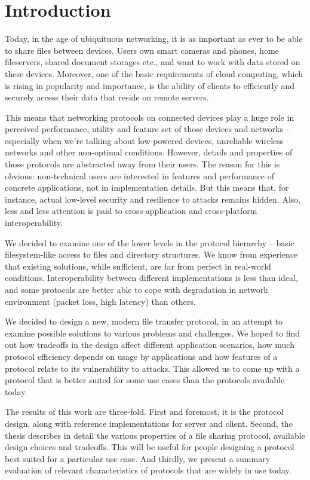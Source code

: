 \chapter*{Introduction}

Today, in the age of ubiquituous networking, it is as important as ever to be able to share files between
devices. Users own smart cameras and phones, home fileservers, shared document storages etc., and want to
work with data stored on these devices. Moreover, one of the basic requirements of cloud computing, which is
rising in popularity and importance, is the ability of clients to efficiently and securely access their data
that reside on remote servers.

This means that networking protocols on connected devices play a huge role in perceived performance, utility
and feature set of those devices and networks -- especially when we're talking about low-powered devices,
unreliable wireless networks and other non-optimal conditions. However, details and properties of those
protocols are abstracted away from their users. The reason for this is obvious: non-technical users are
interested in features and performance of concrete applications, not in implementation details. But this means
that, for instance, actual low-level security and resilience to attacks remains hidden. Also, less and less
attention is paid to cross-application and cross-platform interoperability.

We decided to examine one of the lower levels in the protocol hierarchy -- basic filesystem-like access to
files and directory structures. We know from experience that existing solutions, while sufficient, are
far from perfect in real-world conditions. Interoperability between different implementations is less than ideal,
and some protocols are better able to cope with degradation in network environment (packet loss, high latency)
than others.

We decided to design a new, modern file transfer protocol, in an attempt to examine possible solutions to
various problems and challenges. We hoped to find out how tradeoffs in the design affect different application
scenarios, how much protocol efficiency depends on usage by applications and how features of a protocol relate
to its vulnerability to attacks. This allowed us to come up with a protocol that is better suited for some
use cases than the protocols available today.

The results of this work are three-fold. First and foremost, it is the protocol design, along with reference
implementations for server and client. Second, the thesis describes in detail the various properties of a file
sharing protocol, available design choices and tradeoffs.  This will be useful for people designing a protocol
best suited for a particular use case. And thirdly, we present a summary evaluation of relevant characteristics
of protocols that are widely in use today.

